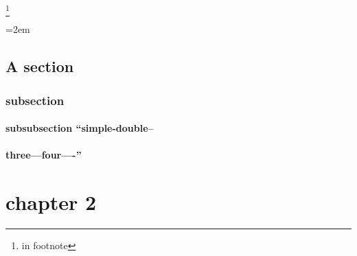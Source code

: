\documentclass{book}
\begin{document}
\footnote{in footnote}

\par\begingroup\obeylines\obeyspaces\frenchspacing\leftskip=2em\relax\parskip=0pt\relax{}%
\endgroup{}%

\section{A section}
\label{anchor:s_002d_002dect_002cion}%


\subsection{subsection}
\label{anchor:subsection}%


\label{anchor:anchor}%

\subsubsection{subsubsection ``simple-double--}
\label{anchor:subsubsection-_0060_0060simple_002ddouble_002d_002d}%

\subsubsection{three---four----''}
\label{anchor:subsubsection-three_002d_002d_002dfour_002d_002d_002d_002d_0027_0027}%

\chapter*{\centering chapter 2}
\label{anchor:chapter2}%

\printindex[cp]
\printindex[fn]
\end{document}
